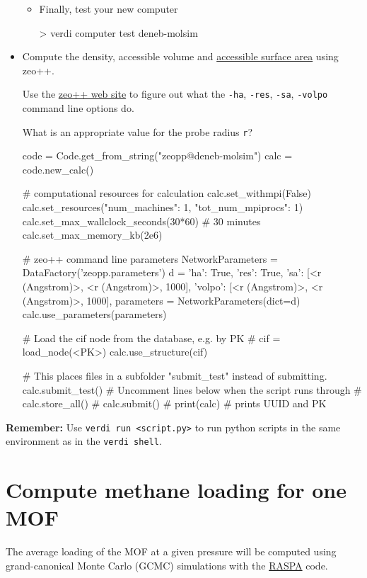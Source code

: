 \documentclass[twoside,a4paper,11pt]{extarticle}
\begin{document}
\begin{itemize}
\begin{itemize}
\item Finally, test your new computer
\begin{bashcommand}
> verdi computer test deneb-molsim
\end{bashcommand}
    \end{itemize}
    
    \item Compute the density, accessible volume and \href{https://en.wikipedia.org/wiki/Accessible_surface_area}{accessible
    surface area} using zeo++.
    
    Use the \href{http://www.zeoplusplus.org/examples.html}{zeo++ web site} to figure out what the \verb|-ha|, \verb|-res|, \verb|-sa|, \verb|-volpo| command line options do.
    
    What is an appropriate value for the probe radius \verb|r|?
    
\begin{pythoncommand}
code = Code.get_from_string("zeopp@deneb-molsim")
calc = code.new_calc()

# computational resources for calculation
calc.set_withmpi(False)
calc.set_resources({"num_machines": 1, "tot_num_mpiprocs": 1})
calc.set_max_wallclock_seconds(30*60) # 30 minutes
calc.set_max_memory_kb(2e6)

# zeo++ command line parameters
NetworkParameters = DataFactory('zeopp.parameters')
d = {
    'ha': True,
    'res': True,
    'sa': [<r (Angstrom)>, <r (Angstrom)>, 1000],
    'volpo': [<r (Angstrom)>, <r (Angstrom)>, 1000],
}
parameters = NetworkParameters(dict=d)
calc.use_parameters(parameters)

# Load the cif node from the database, e.g. by PK
# cif = load_node(<PK>)
calc.use_structure(cif)

# This places files in a subfolder "submit_test" instead of submitting.
calc.submit_test()
# Uncomment lines below when the script runs through
# calc.store_all()
# calc.submit()
# print(calc)  # prints UUID and PK
\end{pythoncommand}

\end{itemize}

\begin{tcolorbox}
\textbf{Remember:} Use \verb|verdi run <script.py>| to run python scripts in the same
environment as in the \verb|verdi shell|.
\end{tcolorbox}


\section{Compute methane loading for one MOF}
The average loading of the MOF at a given pressure will be computed 
using grand-canonical Monte Carlo (GCMC) simulations with the \href{https://github.com/numat/RASPA2}{RASPA} code.
\end{document}
